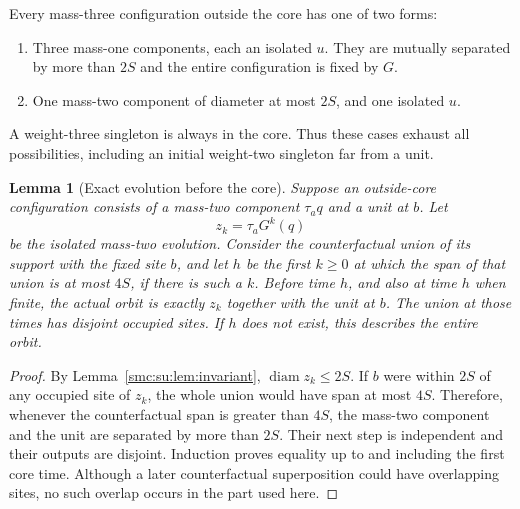 \documentclass[11pt,letterpaper]{article}
\numberwithin{equation}{section}
\newtheorem{lemma}[theorem]{Lemma}
\theoremstyle{definition}
\theoremstyle{remark}
\newcommand{\diam}{\operatorname{diam}}
\begin{document}
Every mass-three configuration outside the core has one of two forms:
\begin{enumerate}
\item Three mass-one components, each an isolated $u$. They are mutually
separated by more than $2S$ and the entire configuration is fixed by $G$.
\item One mass-two component of diameter at most $2S$, and one isolated $u$.
\end{enumerate}
A weight-three singleton is always in the core. Thus these cases exhaust all
possibilities, including an initial weight-two singleton far from a unit.

\begin{lemma}[Exact evolution before the core]\label{smc:su:lem:outside}
Suppose an outside-core configuration consists of a mass-two component
$\tau_a q$ and a unit at $b$. Let
\[
 z_k=\tau_a G^k(q)
\]
be the isolated mass-two evolution. Consider the counterfactual union of its
support with the fixed site $b$, and let $h$ be the first $k\ge0$ at which the
span of that union is at most $4S$, if there is such a $k$.
Before time $h$, and also at time $h$ when finite, the actual orbit is exactly
$z_k$ together with the unit at $b$. The union at those times has disjoint
occupied sites. If $h$ does not exist, this describes the entire orbit.
\end{lemma}
\begin{proof}
By Lemma~\ref{smc:su:lem:invariant}, $\diam z_k\le2S$. If $b$ were within $2S$ of
any occupied site of $z_k$, the whole union would have span at most $4S$.
Therefore, whenever the counterfactual span is greater than $4S$, the mass-two
component and the unit are separated by more than $2S$. Their next step is
independent and their outputs are disjoint. Induction proves equality up to and
including the first core time. Although a later counterfactual superposition
could have overlapping sites, no such overlap occurs in the part used here.
\end{proof}
\end{document}
